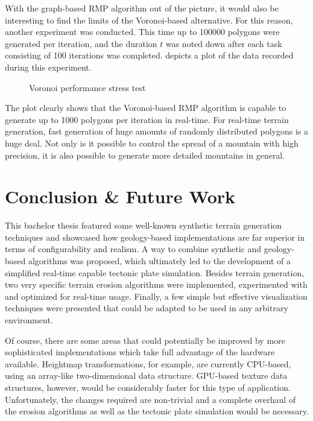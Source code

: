 \documentclass[11pt,a4paper,twoside,openright]{report}
\begin{document}
With the graph-based RMP algorithm out of the picture, it would also be interesting to find the limits of the Voronoi-based alternative. For this reason, another experiment was conducted. This time up to 100000 polygons were generated per iteration, and the duration $t$ was noted down after each task consisting of 100 iterations was completed.  depicts a plot of the data recorded during this experiment.
\begin{figure}[h]
\centering
{}
\caption{Voronoi performance stress test}
\label{fig:voronoiperformancestresstest}
\end{figure}
The plot clearly shows that the Voronoi-based RMP algorithm is capable to generate up to 1000 polygons per iteration in real-time. For real-time terrain generation, fast generation of huge amounts of randomly distributed polygons is a huge deal. Not only is it possible to control the spread of a mountain with high precision, it is also possible to generate more detailed mountains in general.

\chapter{Conclusion \& Future Work}
\label{sec:concl}
This bachelor thesis featured some well-known synthetic terrain generation techniques and showcased how geology-based implementations are far superior in terms of configurability and realism. A way to combine synthetic and geology-based algorithms was proposed, which ultimately led to the development of a simplified real-time capable tectonic plate simulation. Besides terrain generation, two very specific terrain erosion algorithms were implemented, experimented with and optimized for real-time usage. Finally, a few simple but effective visualization techniques were presented that could be adapted to be used in any arbitrary environment.

Of course, there are some areas that could potentially be improved by more sophisticated implementations which take full advantage of the hardware available. Heightmap transformations, for example, are currently CPU-based, using an array-like two-dimensional data structure. GPU-based texture data structures, however, would be considerably faster for this type of application. Unfortunately, the changes required are non-trivial and a complete overhaul of the erosion algorithms as well as the tectonic plate simulation would be necessary.
\end{document}

